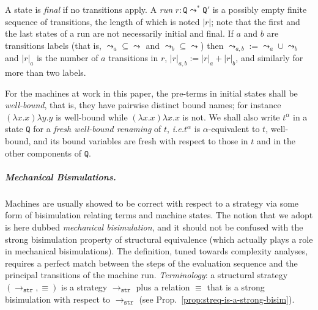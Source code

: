 \documentclass[10pt,a4paper]{article}
\theoremstyle{remark}
\newcommand{\la}[1]{\lambda #1.}
\newcommand{\tm}{t}
\newcommand{\var}{x}
\newcommand{\vartwo}{y}
\newcommand{\Rew}[1]{\rightarrow_{#1}}
\newcommand{\tostrat}{\Rew{\symfont{str}}}
\newcommand{\symfont}[1]{\mathtt{#1}}
\newcommand{\defeq}{:=}
\newcommand{\streq}{\equiv}
\newcommand{\ie}{{\em i.e.}\xspace}
\newcommand{\refprop}[1]{Prop.~\ref{prop:#1}}
\newcommand{\size}[1]{|#1|}
\newcommand{\sizep}[2]{|#1|_{#2}}
\renewcommand{\state}{\symfont{Q}}
\newcommand{\state}{\symfont{Q}}
\newcommand{\statetwo}{\state'}
\newcommand{\renamenop}[1]{#1^\alpha}
\newcommand{\tomachhole}[1]{\leadsto_{#1}}
\newcommand{\tomach}{\tomachhole{}}
\newcommand{\run}{r}
\begin{document}
A state is \emph{final} if no transitions apply.
 A \emph{run} $\run: \state \tomach^*\statetwo$ is a possibly empty finite sequence of transitions, the length of which is noted 
$\size\run$; note that the first and the last states of a run are not necessarily initial and final. 
If $a$ and $b$ are transitions labels (that is, $\tomachhole{a}\subseteq \tomach$ and 
$\tomachhole{b}\subseteq \tomach$) then $\tomachhole{a,b} \defeq \tomachhole{a}\cup \tomachhole{b}$ and $\sizep\run a$ 
is the number of $a$ transitions in $\run$, $\sizep\run {a,b} \defeq \sizep\run a + \sizep\run b $, and similarly for more than two labels. 


For the machines at work in this paper, the pre-terms in initial states shall be \emph{well-bound}, that is, they have pairwise distinct bound names; for instance $(\la\var\var)\la\vartwo\vartwo$ is well-bound while $(\la\var\var)\la\var\var$ is not. 
We shall also write $\renamenop{\tm}$ in a state $\state$ for a \emph{fresh well-bound renaming} of $\tm$,
\ie $\renamenop{\tm}$ is $\alpha$-equivalent to $\tm$, well-bound, and its bound variables
are fresh with respect to those in $\tm$ and in the other components of $\state$.

\subparagraph{Mechanical Bismulations.} Machines are usually showed to be correct with respect to a strategy via some form of bisimulation relating terms and machine states. The notion that we adopt is here dubbed \emph{mechanical bisimulation}, and it should not be confused with the strong bisimulation property of structural equivalence (which actually plays a role in mechanical bisimulations). The definition, tuned towards complexity analyses, requires a perfect match between the steps of the evaluation sequence and the  principal transitions of the machine run. \emph{Terminology}: a structural strategy $(\tostrat,\streq)$ is a strategy $\tostrat$ plus a relation $\streq$ that is a strong bisimulation with respect to $\tostrat$ (see \refprop{streq-is-a-strong-bisim}).
\end{document}

